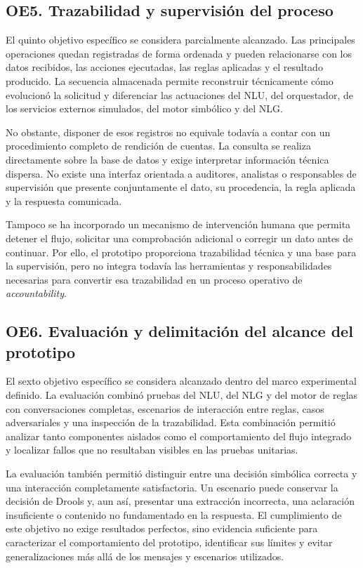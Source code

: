 \documentclass[12pt,a4paper]{report}
\begin{document}
\subsection{OE5. Trazabilidad y supervisión del proceso}

El quinto objetivo específico se considera parcialmente alcanzado. Las principales operaciones quedan registradas de forma ordenada y pueden relacionarse con los datos recibidos, las acciones ejecutadas, las reglas aplicadas y el resultado producido. La secuencia almacenada permite reconstruir técnicamente cómo evolucionó la solicitud y diferenciar las actuaciones del NLU, del orquestador, de los servicios externos simulados, del motor simbólico y del NLG.

No obstante, disponer de esos registros no equivale todavía a contar con un procedimiento completo de rendición de cuentas. La consulta se realiza directamente sobre la base de datos y exige interpretar información técnica dispersa. No existe una interfaz orientada a auditores, analistas o responsables de supervisión que presente conjuntamente el dato, su procedencia, la regla aplicada y la respuesta comunicada.

Tampoco se ha incorporado un mecanismo de intervención humana que permita detener el flujo, solicitar una comprobación adicional o corregir un dato antes de continuar. Por ello, el prototipo proporciona trazabilidad técnica y una base para la supervisión, pero no integra todavía las herramientas y responsabilidades necesarias para convertir esa trazabilidad en un proceso operativo de \textit{accountability}.

\subsection{OE6. Evaluación y delimitación del alcance del prototipo}

El sexto objetivo específico se considera alcanzado dentro del marco experimental definido. La evaluación combinó pruebas del NLU, del NLG y del motor de reglas con conversaciones completas, escenarios de interacción entre reglas, casos adversariales y una inspección de la trazabilidad. Esta combinación permitió analizar tanto componentes aislados como el comportamiento del flujo integrado y localizar fallos que no resultaban visibles en las pruebas unitarias.

La evaluación también permitió distinguir entre una decisión simbólica correcta y una interacción completamente satisfactoria. Un escenario puede conservar la decisión de Drools y, aun así, presentar una extracción incorrecta, una aclaración insuficiente o contenido no fundamentado en la respuesta. El cumplimiento de este objetivo no exige resultados perfectos, sino evidencia suficiente para caracterizar el comportamiento del prototipo, identificar sus límites y evitar generalizaciones más allá de los mensajes y escenarios utilizados.
\end{document}
